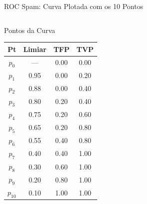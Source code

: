 \documentclass[aspectratio=169]{beamer}
\begin{document}
\begin{frame}{ROC Spam: Curva Plotada com os 10 Pontos}
  \vspace{-0.8cm}
\begin{columns}[T]
\vspace{0.3em}
\begin{block}{Pontos da Curva}
  \footnotesize
  \renewcommand{\arraystretch}{1.2}
  \begin{tabular}{cccc}
  \toprule
  \textbf{Pt} & \textbf{Limiar} & \textbf{TFP} & \textbf{TVP} \\
  \midrule
  $p_0$ & — & 0.00 & 0.00 \\
  $p_1$ & 0.95 & 0.00 & 0.20 \\
  $p_2$ & 0.88 & 0.00 & 0.40 \\
  $p_3$ & 0.80 & 0.20 & 0.40 \\
  $p_4$ & 0.75 & 0.20 & 0.60 \\
  \rowcolor{minegreen!15}
  $p_5$ & 0.65 & 0.20 & 0.80 \\
  $p_6$ & 0.55 & 0.40 & 0.80 \\
  $p_7$ & 0.40 & 0.40 & 1.00 \\
  $p_8$ & 0.30 & 0.60 & 1.00 \\
  $p_9$ & 0.20 & 0.80 & 1.00 \\
  $p_{10}$ & 0.10 & 1.00 & 1.00 \\
  \bottomrule
  \end{tabular}
\end{block}


\end{columns}
\end{frame}
\end{document}
